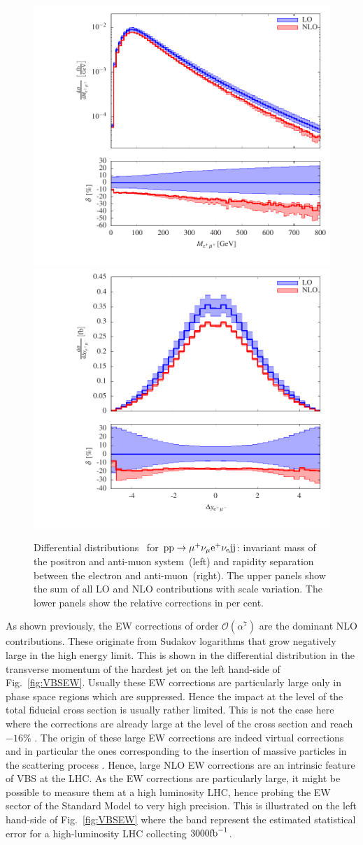 \begin{figure}
\includegraphics[width=.47\textwidth]{WG1_plots/histogram_invariant_mass_epmu_scale}
\hfill
\includegraphics[width=.47\textwidth]{WG1_plots/histogram_rapidity_separation_pomu_scale}
\caption{Differential distributions~\cite{Biedermann:2017bss} for ${\rm p}{\rm p}\to\mu^+\nu_\mu{\rm e}^+\nu_{\rm e}{\rm j}{\rm j}$:
invariant mass of the positron and anti-muon system~(left) and rapidity separation between the electron and anti-muon~(right).
The upper panels show the sum of all LO and NLO contributions with scale variation.
The lower panels show the relative corrections in per cent.}
\label{fig:VBSAAL_sum}
\end{figure}

As shown previously, the EW corrections of order $\mathcal{O}\left(\alpha^7\right)$ are the dominant NLO contributions.
These originate from Sudakov logarithms that grow negatively large in the high energy limit.
This is shown in the differential distribution in the transverse momentum of the hardest jet on the left hand-side of Fig.~\ref{fig:VBSEW}.
Usually these EW corrections are particularly large only in phase space regions which are suppressed.
Hence the impact at the level of the total fiducial cross section is usually rather limited.
This is not the case here where the corrections are already large at the level of the cross section and reach $-16\%$ \cite{Biedermann:2016yds}.
The origin of these large EW corrections are indeed virtual corrections and in particular the ones corresponding to the insertion of massive particles in the scattering process \cite{Biedermann:2016yds}.
Hence, large NLO EW corrections are an intrinsic feature of VBS at the LHC.
As the EW corrections are particularly large, it might be possible to measure them at a high luminosity LHC, hence probing the EW sector of the Standard Model to very high precision.
This is illustrated on the left hand-side of Fig.~\ref{fig:VBSEW} where the band represent the estimated statistical error for a high-luminosity LHC collecting $3000{\rm fb}^{-1}$.

